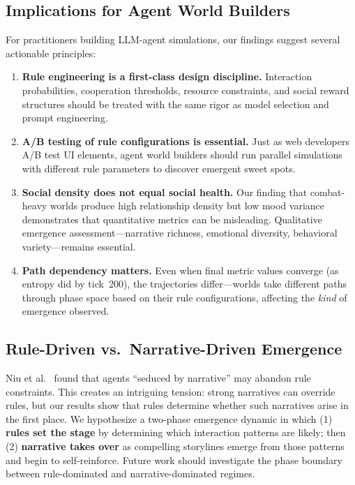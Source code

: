 \documentclass[11pt]{article}
\begin{document}
\subsection{Implications for Agent World Builders}

For practitioners building LLM-agent simulations, our findings suggest several actionable principles:

\begin{enumerate}[leftmargin=*,nosep]
    \item \textbf{Rule engineering is a first-class design discipline.} Interaction probabilities, cooperation thresholds, resource constraints, and social reward structures should be treated with the same rigor as model selection and prompt engineering.
    \item \textbf{A/B testing of rule configurations is essential.} Just as web developers A/B test UI elements, agent world builders should run parallel simulations with different rule parameters to discover emergent sweet spots.
    \item \textbf{Social density does not equal social health.} Our finding that combat-heavy worlds produce high relationship density but low mood variance demonstrates that quantitative metrics can be misleading. Qualitative emergence assessment---narrative richness, emotional diversity, behavioral variety---remains essential.
    \item \textbf{Path dependency matters.} Even when final metric values converge (as entropy did by tick~200), the trajectories differ---worlds take different paths through phase space based on their rule configurations, affecting the \emph{kind} of emergence observed.
\end{enumerate}

\subsection{Rule-Driven vs.\ Narrative-Driven Emergence}

Niu et al.~\cite{niu2026seduced} found that agents ``seduced by narrative'' may abandon rule constraints.
This creates an intriguing tension: strong narratives can override rules, but our results show that rules determine whether such narratives arise in the first place.
We hypothesize a two-phase emergence dynamic in which (1) \textbf{rules set the stage} by determining which interaction patterns are likely; then (2) \textbf{narrative takes over} as compelling storylines emerge from those patterns and begin to self-reinforce.
Future work should investigate the phase boundary between rule-dominated and narrative-dominated regimes.
\end{document}

